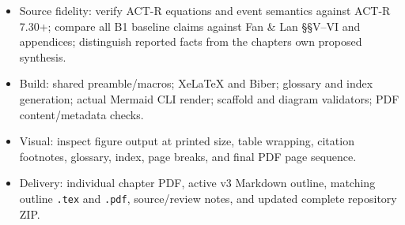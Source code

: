 \begin{itemize}
\tightlist
\item
  Source fidelity: verify ACT-R equations and event semantics against ACT-R 7.30+; compare all B1 baseline claims against Fan \& Lan §§V--VI and appendices; distinguish reported facts from the chapter\textquotesingle s own proposed synthesis.
\item
  Build: shared preamble/macros; XeLaTeX and Biber; glossary and index generation; actual Mermaid CLI render; scaffold and diagram validators; PDF content/metadata checks.
\item
  Visual: inspect figure output at printed size, table wrapping, citation footnotes, glossary, index, page breaks, and final PDF page sequence.
\item
  Delivery: individual chapter PDF, active v3 Markdown outline, matching outline \texttt{.tex} and \texttt{.pdf}, source/review notes, and updated complete repository ZIP.
\end{itemize}



